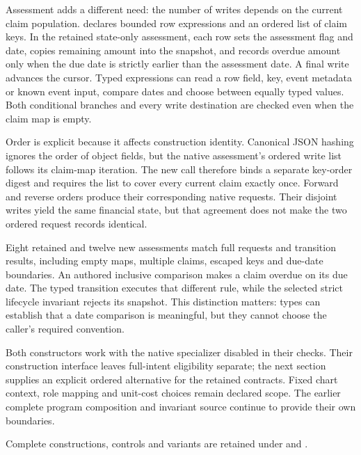 Assessment adds a different need: the number of writes depends on the current
claim population.  declares bounded row
expressions and an ordered list of claim keys. In the retained state-only
assessment, each row sets the assessment flag and date, copies remaining
amount into the snapshot, and records overdue amount only when the due date
is strictly earlier than the assessment date. A final write advances the
cursor. Typed expressions can read a row field, key, event metadata or known
event input, compare dates and choose between equally typed values. Both
conditional branches and every write destination are checked even when the
claim map is empty.

Order is explicit because it affects construction identity. Canonical JSON
hashing ignores the order of object fields, but the native assessment's ordered
write list follows its claim-map iteration. The new call therefore binds a
separate key-order digest and requires the list to cover every current claim
exactly once. Forward and reverse orders produce their corresponding native
requests. Their disjoint writes yield the same financial state, but that
agreement does not make the two ordered request records identical.

Eight retained and twelve new assessments match full requests and transition
results, including empty maps, multiple claims, escaped keys and due-date
boundaries. An authored inclusive comparison makes a claim overdue on its due
date. The typed transition executes that different rule, while the selected
strict lifecycle invariant rejects its snapshot. This distinction matters:
types can establish that a date comparison is meaningful, but they cannot
choose the caller's required convention.

Both constructors work with the native specializer disabled in their checks.
Their construction interface leaves full-intent eligibility separate; the next
section supplies an explicit ordered alternative for the retained contracts.
Fixed chart context, role mapping and unit-cost choices remain declared scope.
The earlier complete program composition and invariant source continue to
provide their own boundaries.

\begingroup\raggedright
Complete constructions, controls and variants are retained under
and .
\par
\endgroup
